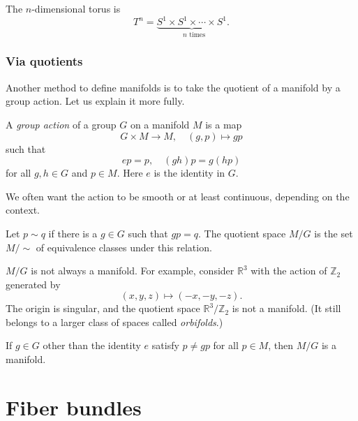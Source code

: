 \documentclass[12pt]{article}
\numberwithin{equation}{section}
\def\bR{\mathbb{R}}
\def\bZ{\mathbb{Z}}
\begin{document}
\begin{example}
  The $n$-dimensional torus is \begin{equation}
    T^n = \underbrace{S^1\times S^1\times \cdots \times S^1}_\text{ $n$ times}.
  \end{equation}
\end{example}

\subsubsection{Via quotients}


Another method to define manifolds is to 
take the quotient of a manifold by a group action. 
Let us explain it more fully.
\begin{definition}
A \emph{group action} of a group $G$ on a manifold $M$ is a map \begin{equation}
  G\times M \to M, \quad (g, p) \mapsto g p
\end{equation} such that \begin{equation}
  e p = p, \quad (gh) p = g (h p)
\end{equation} for all $g,h\in G$ and $p\in M$.
Here $e$ is the identity in $G$.
\end{definition}
We often want the action to be smooth or at least continuous,
depending on the context.

\begin{definition}
Let $p\sim q$ if there is a $g\in G$ such that $g p = q$.
The quotient space $M/G$ is the set $M/\sim$ of equivalence classes 
under this relation.
\end{definition}

$M/G$ is not always a manifold.
For example, consider $\bR^3$ with the action of $\bZ_2$ generated by 
\begin{equation}
(x,y,z) \mapsto (-x,-y,-z).
\end{equation}
The origin is singular, and the quotient space $\bR^3/\bZ_2$ is not a manifold.
(It still belongs to a larger class of spaces called \emph{orbifolds}.)

\begin{theorem}
  If  $g\in G$ other than the identity $e$
  satisfy $p\neq gp$ for all $p\in M$,
  then $M/G$ is a manifold.
\end{theorem}

\section{Fiber bundles}
\end{document}
